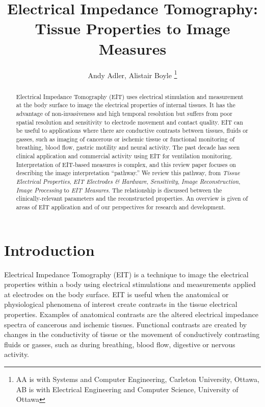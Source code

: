 \documentclass[10pt,journal]{IEEEtran}\def\TBLWIDA{15mm}\def\TBLWIDB{60mm}
\begin{document}
\title{Electrical Impedance Tomography:\\ Tissue Properties to Image Measures}
\author{Andy Adler, Alistair Boyle
\thanks{AA is with Systems and Computer Engineering, Carleton University, Ottawa, AB is with Electrical Engineering and Computer Science, University of Ottawa}
}
\date{}
\maketitle

\begin{abstract}
Electrical Impedance Tomography (EIT) uses electrical
stimulation and measurement at the body surface to
image the electrical properties of internal tissues.
It has the advantage of non-invasiveness and
high temporal resolution but suffers from poor spatial
resolution and sensitivity to electrode movement and
contact quality.
EIT can be useful to applications where there are conductive contrasts between
tissues, fluids or gasses, such as imaging of cancerous
or ischemic tissue or functional monitoring
of breathing, blood flow, gastric motility
and neural activity.
The past decade has seen clinical application and commercial
activity using EIT for ventilation monitoring.
Interpretation of EIT-based measures is complex, and
this review paper focuses on 
describing the image interpretation ``pathway.''
We review this pathway, from
{\em Tissue Electrical Properties},
{\em EIT Electrodes \& Hardware},
{\em Sensitivity},
{\em Image Reconstruction},
{\em Image Processing}
to 
{\em EIT Measures}.
The relationship is discussed between the 
clinically-relevant parameters and the 
reconstructed properties.
An overview is given of areas of EIT application
and of our perspectives for
research and development.
\end{abstract}


\section{Introduction}

Electrical Impedance Tomography (EIT) is a technique to 
image the electrical properties within a body using
electrical stimulations and measurements applied at electrodes
on the body surface.
EIT is useful when the
anatomical or physiological phenomena of interest
create contrasts in the tissue electrical properties.
Examples of anatomical contrasts are 
the altered electrical impedance spectra of
cancerous \cite{Jossinet1998Breast} and
ischemic \cite{Packham2012Frequency} tissues.
Functional contrasts are created by changes
in the conductivity of tissue or the movement of
conductively contrasting fluids or gasses, such as during
breathing, blood flow, digestive or nervous activity.
\end{document}
